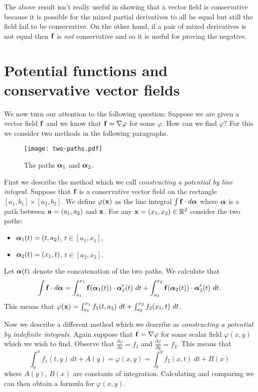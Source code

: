 The above result isn't really useful in showing that a vector field is conservative because it is possible for the mixed partial derivatives to all be equal but still the field fail to be conservative.
On the other hand, if a pair of mixed derivatives is not equal then \(\ff\) is \emph{not} conservative and so it is useful for proving the negative.

\section{Potential functions and conservative vector fields}

We now turn our attention to the following question:
Suppose we are given a vector field \(\ff\) and we know that \(\ff = \nabla \varphi\) for some \(\varphi\).
How can we find \(\varphi\)?
For this we consider two methods in the following paragraphs.
%
\begin{figure}[tbhp]
    \centering
    \texttt{[image: two-paths.pdf]}
    \caption{The paths \(\aalpha_1\) and \(\aalpha_2\).}
\end{figure}
%
First we describe the method which we call \emph{constructing a potential by line integral}.
Suppose that \(\ff\) is a conservative vector field on the rectangle \([a_1,b_1]\times [a_2,b_2]\).
We define \(\varphi(\xx)\) as the line integral \(\int \ff \cdot d\aalpha\) where \(\aalpha\) is a path between \(\aa=(a_1,a_2)\) and \(\xx\).
For any \(\xx = (x_1,x_2) \in \bR^2\) consider the two paths:
\begin{itemize}
    \item[] \(\aalpha_1(t) = (t,a_2)\), \(t\in [a_1,x_1]\),
    \item[]  \(\aalpha_2(t) = (x_1,t)\),  \(t\in [a_2,x_2]\).
\end{itemize}
Let \(\aalpha(t)\) denote the concatenation of the two paths.
We calculate that
\[
    \int \ff \cdot d\aalpha = \int_{a_1}^{x_1} \ff(\aalpha_1(t))\cdot \aalpha_1'(t) \ dt +  \int_{a_2}^{x_2} \ff(\aalpha_2(t))\cdot \aalpha_2'(t) \ dt.
\]
This means that \(\varphi(\xx)  = \int_{a_1}^{x_1} f_1(t,a_2)\ dt + \int_{a_2}^{x_2} f_2(x_1,t)\ dt \).

Now we describe a different method which we describe as \emph{constructing a potential by indefinite integrals}.
Again suppose that \(\ff = \nabla \varphi\) for some scalar field \(\varphi(x,y)\) which we wish to find.
Observe that \(\frac{\partial \varphi}{\partial x} = f_1\) and  \(\frac{\partial \varphi}{\partial y} = f_2\).
This means that
\[
    \int_{a}^{x} f_1(t,y) \ dt + A(y) = \varphi(x,y) =  \int_{b}^{y} f_2(x,t) \ dt + B(x)
\]
where \(A(y)\), \(B(x)\) are constants of integration.
Calculating and comparing we can then obtain a formula for \(\varphi(x,y)\).


